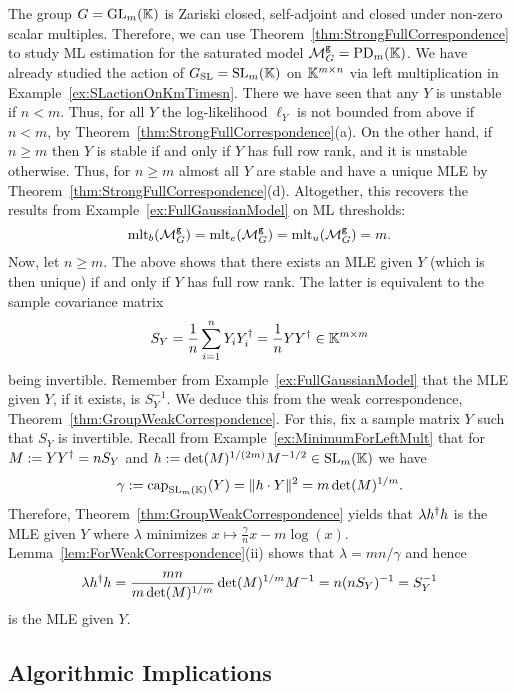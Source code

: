 \begin{example}\label{ex:FullModelSelfAdjoint}
	The group $G = \operatorname{GL}_m(\mathbb K)$ is Zariski closed, self-adjoint and closed under non-zero scalar multiples. Therefore, we can use Theorem~\ref{thm:StrongFullCorrespondence} to study ML estimation for the saturated model $\mathcal{M}^{\mathtt{g}}_G = \operatorname{PD}_m(\mathbb K)$. We have already studied the action of $G_{\operatorname{SL}} = \operatorname{SL}_m(\mathbb K)$ on $\mathbb K^{m \times n}$ via left multiplication in Example~\ref{ex:SLactionOnKmTimesn}. There we have seen that any $Y$ is unstable if $n < m$. Thus, for all $Y$ the log-likelihood $\ell_{Y}$ is not bounded from above if $n <m$, by Theorem~\ref{thm:StrongFullCorrespondence}(a). On the other hand, if $n \geq m$ then $Y$ is stable if and only if $Y$ has full row rank, and it is unstable otherwise. Thus, for $n \geq m$ almost all $Y$ are stable and have a unique MLE by Theorem~\ref{thm:StrongFullCorrespondence}(d). Altogether, this recovers the results from Example~\ref{ex:FullGaussianModel} on ML thresholds:
		\[ \operatorname{mlt}_b(\mathcal{M}^{\mathtt{g}}_G) = \operatorname{mlt}_e(\mathcal{M}^{\mathtt{g}}_G) = \operatorname{mlt}_u(\mathcal{M}^{\mathtt{g}}_G) = m. \]
	Now, let $n \geq m$. The above shows that there exists an MLE given $Y$ (which is then unique) if and only if $Y$ has full row rank. The latter is equivalent to the sample covariance matrix
		\[ S_Y = \frac{1}{n} \sum_{i=1}^n Y_i Y_i^{\dagger} = \frac{1}{n} Y Y^{\dagger} \in \mathbb K^{m \times m} \]
	being invertible. Remember from Example~\ref{ex:FullGaussianModel} that the MLE given $Y$, if it exists, is $S_Y^{-1}$. We deduce this from the weak correspondence, Theorem~\ref{thm:GroupWeakCorrespondence}.
	For this, fix a sample matrix $Y$ such that $S_Y$ is invertible.
	Recall from Example~\ref{ex:MinimumForLeftMult} that for $M := YY^{\dagger} = n S_Y$ and $h := \det(M)^{1/(2m)} M^{-1/2} \in \operatorname{SL}_m(\mathbb K)$ we have
		\[ \gamma := \operatorname{cap}_{\operatorname{SL}_m(\mathbb K)} (Y) = \|h \cdot Y\|^2 = m \det(M)^{1/m} . \]
	Therefore, Theorem~\ref{thm:GroupWeakCorrespondence} yields that $\lambda h^{\dagger} h$ is the MLE given $Y$ where $\lambda$ minimizes $x \mapsto \frac{\gamma}{n} x - m \log(x)$. Lemma~\ref{lem:ForWeakCorrespondence}(ii) shows that $\lambda = mn/\gamma$ and hence
	\[ \lambda h^{\dagger} h = \frac{mn}{m \det(M)^{1/m}} \det(M)^{1/m} M^{-1} 
	= n (n S_Y)^{-1} = S_Y^{-1}  \]
	is the MLE given $Y$.
	\hfill\exSymbol
\end{example}




\subsection{Algorithmic Implications} \label{subsec:AlgorithmsSelfAdjoint}

